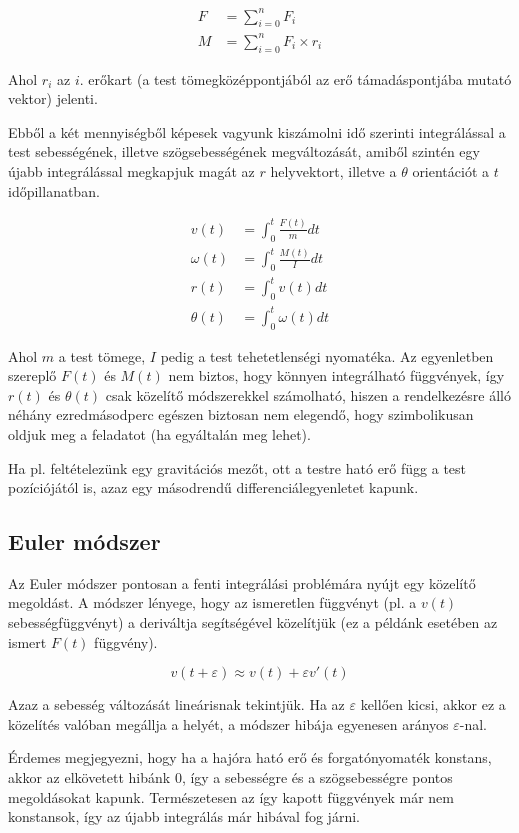 \begin{itemize}
\begin{align*}
F &= \sum_{i=0}^{n} F_i \\
M &= \sum_{i=0}^{n} F_i \times r_i
\end{align*}

Ahol $r_i$ az $i$. erőkart (a test tömegközéppontjából az erő támadáspontjába
mutató vektor) jelenti.

Ebből a két mennyiségből képesek vagyunk kiszámolni idő szerinti integrálással a
test sebességének, illetve szögsebességének megváltozását, amiből szintén egy
újabb integrálással megkapjuk magát az $r$ helyvektort, illetve a $\theta$
orientációt a $t$ időpillanatban.

\begin{align*}
v(t) &= \int_{0}^{t} \frac{F(t)}{m} dt \\
\omega(t) &= \int_{0}^{t} \frac{M(t)}{I} dt \\
r(t) &= \int_{0}^{t} v(t) dt \\
\theta(t) &= \int_{0}^{t} \omega(t) dt
\end{align*}

Ahol $m$ a test tömege, $I$ pedig a test tehetetlenségi nyomatéka.  Az
egyenletben szereplő $F(t)$ és $M(t)$ nem biztos, hogy könnyen integrálható
függvények, így $r(t)$ és $\theta(t)$ csak közelítő módszerekkel számolható,
hiszen a rendelkezésre álló néhány ezredmásodperc egészen biztosan nem elegendő,
hogy szimbolikusan oldjuk meg a feladatot (ha egyáltalán meg lehet).

Ha pl. feltételezünk egy gravitációs mezőt, ott a testre ható erő függ a test pozíciójától is,
azaz egy másodrendű differenciálegyenletet kapunk.

\subsection{Euler módszer}

Az Euler módszer pontosan a fenti integrálási problémára nyújt egy közelítő
megoldást. A módszer lényege, hogy az ismeretlen függvényt (pl. a $v(t)$
sebességfüggvényt) a deriváltja segítségével közelítjük (ez a példánk esetében az
ismert $F(t)$ függvény).

\[
  v(t + \varepsilon) \approx v(t) + \varepsilon v'(t)
\]

Azaz a sebesség változását lineárisnak tekintjük. Ha az $\varepsilon$ kellően kicsi,
akkor ez a közelítés valóban megállja a helyét, a módszer hibája egyenesen arányos
$\varepsilon$-nal.

Érdemes megjegyezni, hogy ha a hajóra ható erő és forgatónyomaték konstans,
akkor az elkövetett hibánk $0$, így a sebességre és a szögsebességre pontos megoldásokat kapunk.
Természetesen az így kapott függvények már nem konstansok, így az újabb integrálás
már hibával fog járni.


\end{itemize}
